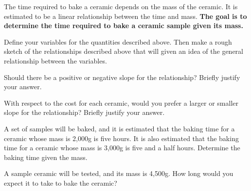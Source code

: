 \begin{problem}

\item The time required to bake a ceramic depends on the mass of the
  ceramic. It is estimated to be a linear relationship between the
  time and mass. \textbf{The goal is to determine the time required to
    bake a ceramic sample given its mass.}
  \begin{subproblem}
    \item Define your variables for the quantities described
      above. Then make a rough sketch of the relationships described
      above that will given an idea of the general relationship
      between the variables.
      \vfill

    \item Should there be a positive or negative slope for the
      relationship? Briefly justify your answer.
      \vfill

    \item With respect to the cost for each ceramic, would you prefer
      a larger or smaller slope for the relationship? Briefly justify
      your answer.
      \vfill

    \item A set of samples will be baked, and it is estimated that the
      baking time for a ceramic whose mass is 2,000g is five hours. It
      is also estimated that the baking time for a ceramic whose mass is
      3,000g is five and a half hours. Determine the baking time given
      the mass.

      \vfill
      \vfill

    \item A sample ceramic will be tested, and its mass is
      4,500g. How long would you expect it to take to bake the
      ceramic?
      \vfill

  \end{subproblem}

  \clearpage


\end{problem}
